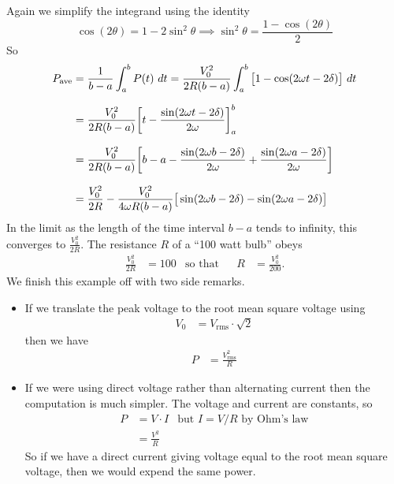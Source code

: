 \begin{eg}
Again we simplify the integrand using the identity
\begin{equation*}
\cos(2\theta) =1-2\sin^2\theta
\implies \sin^2\theta=\frac{1-\cos(2\theta)}{2}
\end{equation*}
So
\begin{align*}
P_\ave &= \frac{1}{b-a}\int_a^b P(t)\ dt
  = \frac{V_0^2}{2R(b-a)}\int_a^b \big[1-\cos(2\omega t-2\delta)\big]\ dt \\[0.1in]
&=\frac{V_0^2}{2R(b-a)}\bigg[t-\frac{\sin(2\omega t-2\delta)}{2\omega}\bigg]_a^b \\[0.1in]
&=\frac{V_0^2}{2R(b-a)}\bigg[b-a-\frac{\sin(2\omega b-2\delta)}{2\omega}
  +\frac{\sin(2\omega a-2\delta)}{2\omega}\bigg]\\[0.1in]
&=\frac{V_0^2}{2R}
   -\frac{V_0^2}{4\omega R(b-a)}\big[\sin(2\omega b-2\delta)-\sin(2\omega a-2\delta)\big]
\end{align*}
In the limit as the length of the time interval $b-a$ tends to infinity,
this converges to $\frac{V_0^2}{2R}$. The resistance $R$ of a
``100 watt bulb''  obeys
\begin{align*}
\frac{V_0^2}{2R} &=100 & \text{so that} &&
R &= \frac{V_0^2}{200}.
\end{align*}
We finish this example off with two side remarks.
\begin{itemize}
  \item
  If we translate the peak voltage to the root mean square voltage using
\begin{align*}
  V_0 &= V_\mathrm{rms} \cdot \sqrt{2}
\end{align*}
then we have
\begin{align*}
  P &= \frac{V^2_{\mathrm{rms}}}{R}
\end{align*}
  \item If we were using direct voltage rather than alternating current then the
computation is
much simpler. The voltage and current are constants, so
\begin{align*}
  P &= V \cdot I & \text{but $I = V/R$ by Ohm's law} \\
  &= \frac{V^2}{R}
\end{align*}
So if we have a direct current giving voltage equal to the root mean square voltage, then
we would expend the same power.
\end{itemize}

\end{eg}

